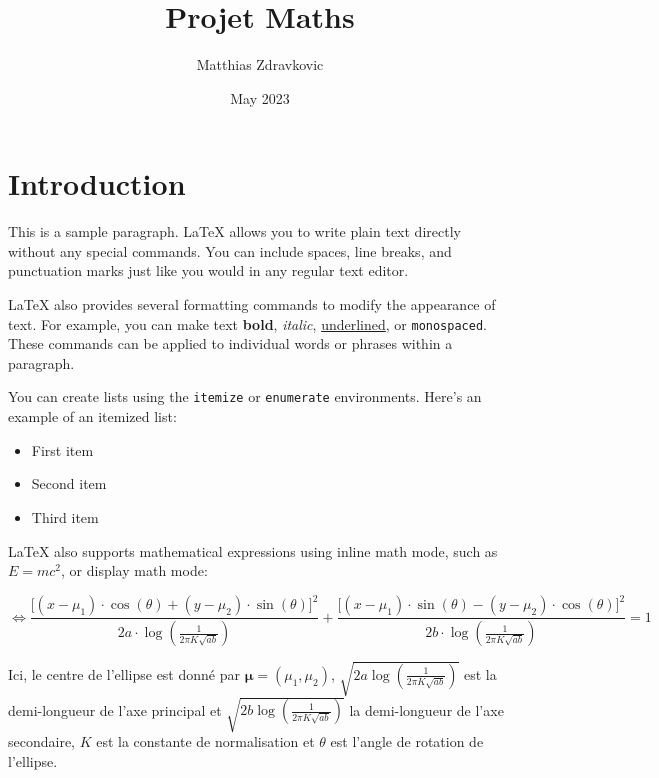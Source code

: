 \documentclass{article}
\title{Projet Maths}
\author{Matthias Zdravkovic}
\date{May 2023}
\begin{document}
\maketitle

\section{Introduction}

This is a sample paragraph. LaTeX allows you to write plain text directly without any special commands. You can include spaces, line breaks, and punctuation marks just like you would in any regular text editor.

LaTeX also provides several formatting commands to modify the appearance of text. For example, you can make text \textbf{bold}, \textit{italic}, \underline{underlined}, or \texttt{monospaced}. These commands can be applied to individual words or phrases within a paragraph.

You can create lists using the \texttt{itemize} or \texttt{enumerate} environments. Here's an example of an itemized list:

\begin{itemize}
    \item First item
    \item Second item
    \item Third item
\end{itemize}

LaTeX also supports mathematical expressions using inline math mode, such as $E = mc^2$, or display math mode:

\[
    \Leftrightarrow \frac{{[(x - \mu_1) \cdot \cos(\theta) + (y - \mu_2) \cdot \sin(\theta)}]^2}{{2a \cdot \log(\frac{1}{2\pi K \sqrt{ab}})}} + \frac{{[(x - \mu_1) \cdot \sin(\theta)-(y - \mu_2) \cdot \cos(\theta)}]^2}{{2b \cdot \log(\frac{1}{2\pi K \sqrt{ab}})}} = 1
\]

Ici, le centre de l'ellipse est donné par $\mathbf{\mu} = (\mu_1, \mu_2)$, $\sqrt{2a \log(\frac{1}{2\pi K \sqrt{ab}})}$ est la demi-longueur de l'axe principal et $\sqrt{2b \log(\frac{1}{2\pi K \sqrt{ab}})}$ la demi-longueur de l'axe secondaire, $K$ est la constante de normalisation et $\theta$ est l'angle de rotation de l'ellipse.
\end{document}
